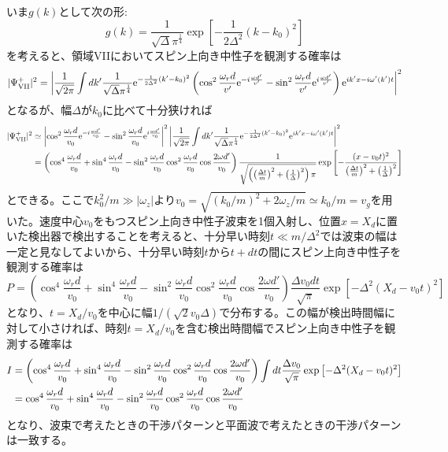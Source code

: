 いま$g(k)$として次の形:
\begin{equation}
g(k)=\frac{1}{\sqrt{\Delta} \pi^{\frac{1}{4}}} \exp \left[-\frac{1}{2\Delta^2}(k-k_0)^2\right]
\end{equation}
を考えると、領域VIIにおいてスピン上向き中性子を観測する確率は
\begin{equation}
|\Psi_\mathrm{VII}^+|^2=\left|\frac{1}{\sqrt{2\pi}}\int dk' \frac{1}{\sqrt{\Delta} \pi^{\frac{1}{4}}} \mathrm{e}^{ -\frac{1}{2\Delta^2}(k'-k_0)^2}\left( \cos^2 \frac{\omega_r d}{v'} \mathrm{e}^{-i\frac{\omega d'}{v'}} -\sin^2 \frac{\omega_r d}{v'} \mathrm{e}^{i\frac{\omega d'}{v'}} \right) \mathrm{e}^{i k'x-i\omega'(k')t} \right|^2
\end{equation}
となるが、幅$\Delta$が$k_0$に比べて十分狭ければ
\begin{align}
|\Psi_\mathrm{VII}^+|^2&\simeq \left| \cos^2 \frac{\omega_r d}{v_0} \mathrm{e}^{-i\frac{\omega d'}{v_0}} -\sin^2 \frac{\omega_r d}{v_0} \mathrm{e}^{i\frac{\omega d'}{v_0}} \right|^2 \left|\frac{1}{\sqrt{2\pi}}\int dk' \frac{1}{\sqrt{\Delta} \pi^{\frac{1}{4}}} \mathrm{e}^{ -\frac{1}{2\Delta^2}(k'-k_0)^2}\mathrm{e}^{i k'x-i\omega'(k')t} \right|^2 \notag \\
&=\left(\cos^4 \frac{\omega_r d}{v_0} +\sin^4 \frac{\omega_r d}{v_0}-\sin^2 \frac{\omega_r d}{v_0} \cos^2 \frac{\omega_r d}{v_0} \cos \frac{2\omega d'}{v_0} \right) \frac{1}{\sqrt{\left(\left(\frac{\Delta t}{m}\right)^2+\left(\frac{1}{\Delta}\right)^2\right)\pi}}\exp\left[-\frac{(x-v_0 t)^2}{\left(\frac{\Delta t}{m}\right)^2+\left(\frac{1}{\Delta}\right)^2}\right]
\end{align}
とできる。ここで$k_0^2/m \gg |\omega_z|$より$v_0=\sqrt{(k_0/m)^2+2\omega_z/m}\simeq k_0/m=v_g$を用いた。速度中心$v_0$をもつスピン上向き中性子波束を1個入射し、位置$x=X_d$に置いた検出器で検出することを考えると、十分早い時刻$t \ll m/\Delta^2$では波束の幅は一定と見なしてよいから、十分早い時刻$t$から$t+dt$の間にスピン上向き中性子を観測する確率は
\begin{equation}
P=\left(\cos^4 \frac{\omega_r d}{v_0} +\sin^4 \frac{\omega_r d}{v_0}-\sin^2 \frac{\omega_r d}{v_0} \cos^2 \frac{\omega_r d}{v_0} \cos \frac{2\omega d'}{v_0} \right) \frac{\Delta v_0dt}{\sqrt{\pi}}\exp\left[-\Delta^2(X_d-v_0 t)^2\right]
\end{equation}
となり、$t=X_d/v_0$を中心に幅$1/(\sqrt{2} v_0 \Delta)$で分布する。この幅が検出時間幅に対して小さければ、時刻$t=X_d/v_0$を含む検出時間幅でスピン上向き中性子を観測する確率は
\begin{align}
I&=\left(\cos^4 \frac{\omega_r d}{v_0} +\sin^4 \frac{\omega_r d}{v_0}-\sin^2 \frac{\omega_r d}{v_0} \cos^2 \frac{\omega_r d}{v_0} \cos \frac{2\omega d'}{v_0} \right) \int dt \frac{\Delta v_0}{\sqrt{\pi}}\exp\left[-\Delta^2(X_d-v_0 t)^2\right] \notag \\
&=\cos^4 \frac{\omega_r d}{v_0} +\sin^4 \frac{\omega_r d}{v_0}-\sin^2 \frac{\omega_r d}{v_0} \cos^2 \frac{\omega_r d}{v_0} \cos \frac{2\omega d'}{v_0}
\end{align}
となり、波束で考えたときの干渉パターンと平面波で考えたときの干渉パターンは一致する。


